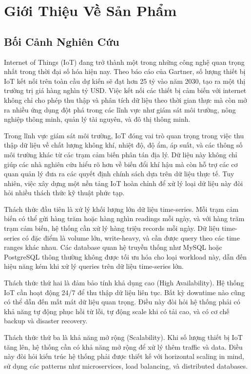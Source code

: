 \section{Giới Thiệu Về Sản Phẩm}

\subsection{Bối Cảnh Nghiên Cứu}

Internet of Things (IoT) đang trở thành một trong những công nghệ quan trọng nhất trong thời đại số hóa hiện nay. Theo báo cáo của Gartner, số lượng thiết bị IoT kết nối trên toàn cầu dự kiến sẽ đạt hơn 25 tỷ vào năm 2030, tạo ra một thị trường trị giá hàng nghìn tỷ USD. Việc kết nối các thiết bị cảm biến với internet không chỉ cho phép thu thập và phân tích dữ liệu theo thời gian thực mà còn mở ra nhiều ứng dụng đột phá trong các lĩnh vực như giám sát môi trường, nông nghiệp thông minh, quản lý tài nguyên, và đô thị thông minh.

Trong lĩnh vực giám sát môi trường, IoT đóng vai trò quan trọng trong việc thu thập dữ liệu về chất lượng không khí, nhiệt độ, độ ẩm, áp suất, và các thông số môi trường khác từ các trạm cảm biến phân tán địa lý. Dữ liệu này không chỉ giúp các nhà nghiên cứu hiểu rõ hơn về biến đổi khí hậu mà còn hỗ trợ các cơ quan quản lý đưa ra các quyết định chính sách dựa trên dữ liệu thực tế. Tuy nhiên, việc xây dựng một nền tảng IoT hoàn chỉnh để xử lý loại dữ liệu này đòi hỏi nhiều thách thức kỹ thuật phức tạp.

Thách thức đầu tiên là xử lý khối lượng lớn dữ liệu time-series. Mỗi trạm cảm biến có thể gửi hàng trăm hoặc hàng nghìn readings mỗi ngày, và với hàng trăm trạm cảm biến, hệ thống cần xử lý hàng triệu records mỗi ngày. Dữ liệu time-series có đặc điểm là volume lớn, write-heavy, và cần được query theo các time ranges khác nhau. Các database quan hệ truyền thống như MySQL hoặc PostgreSQL thông thường không được tối ưu hóa cho loại workload này, dẫn đến hiệu năng kém khi xử lý queries trên dữ liệu time-series lớn.

Thách thức thứ hai là đảm bảo tính khả dụng cao (High Availability). Hệ thống IoT cần hoạt động 24/7 để thu thập dữ liệu liên tục. Bất kỳ downtime nào cũng có thể dẫn đến mất mát dữ liệu quan trọng. Điều này đòi hỏi hệ thống phải có khả năng tự động phục hồi từ lỗi, tự động scale khi có tải cao, và có cơ chế backup và disaster recovery.

Thách thức thứ ba là khả năng mở rộng (Scalability). Khi số lượng thiết bị IoT tăng lên, hệ thống cần có khả năng mở rộng để xử lý thêm traffic và data. Điều này đòi hỏi kiến trúc hệ thống phải được thiết kế với horizontal scaling in mind, sử dụng các patterns như microservices, load balancing, và distributed databases.

